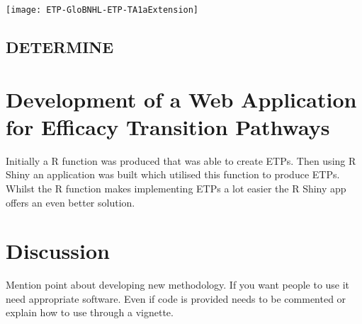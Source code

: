 \begin{sidewaysfigure}[h!]
	\centering
	\caption{ETP for the expansion stage of treatment arm \RN{1}a in Glo-BNHL.}
	\label{fig_etp:GloBNHL-ETP-TA1aExtenstion}
	\texttt{[image: ETP-GloBNHL-ETP-TA1aExtension]}
\end{sidewaysfigure} 

\clearpage



\subsection{DETERMINE}



\section{Development of a Web Application for Efficacy Transition Pathways}

Initially a R function was produced that was able to create ETPs. Then using R Shiny an application was built which utilised this function to produce ETPs. Whilst the R function makes implementing ETPs a lot easier the R Shiny app offers an even better solution.



\section{Discussion}

Mention point about developing new methodology. If you want people to use it need appropriate software. Even if code is provided needs to be commented or explain how to use through a vignette. 
